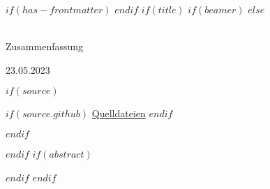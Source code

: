 $if(has-frontmatter)$
\frontmatter
$endif$
$if(title)$ %
$if(beamer)$ %
\frame{\titlepage}
$else$ %

\makeatletter
\begin{center}
  \vspace*{0.5cm}
  
  \textbf{\Huge \@title}\\
  \vspace{0.1cm}
  \textsf{\normalsize Zusammenfassung}
  
  \vspace{0.1cm}

  {\Large {\@author \hspace{2.7cm} 23.05.2023}}
  
  \vspace{0.5cm}

\end{center}
\makeatother

$if(source)$ %
\begin{center}
$if(source.github)$
{\large \faGithub\space \href{$source.github$}{Quelldateien}}
$endif$
\end{center}
$endif$ %


$endif$ %
$if(abstract)$
\begin{abstract}
$abstract$
\end{abstract}
$endif$
$endif$ %


\ifdefined\Shaded\renewenvironment{Shaded}{\begin{tcolorbox}[colback={shadecolor}, boxrule=0pt, frame hidden, enhanced, breakable]}{\end{tcolorbox}}\fi
